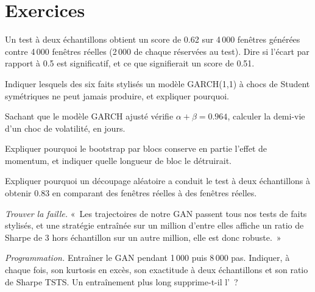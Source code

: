 \section{Exercices}

\begin{exercise}[$\star$]\label{exo:ml:generative-models-and-synthetic-data:1}
Un test à deux échantillons obtient un score de 0.62 sur 4\,000 fenêtres générées contre 4\,000 fenêtres réelles (2\,000 de chaque réservées au test). Dire si l'écart
par rapport à 0.5 est significatif, et ce que signifierait un score de 0.51.
\end{exercise}

\begin{exercise}[$\star$]\label{exo:ml:generative-models-and-synthetic-data:2}
Indiquer lesquels des six faits stylisés un modèle GARCH(1,1) à chocs de Student symétriques ne peut jamais produire, et expliquer pourquoi.
\end{exercise}

\begin{exercise}[$\star$]\label{exo:ml:generative-models-and-synthetic-data:3}
Sachant que le modèle GARCH ajusté vérifie $\alpha + \beta = 0.964$, calculer la demi-vie d'un choc de volatilité, en jours.
\end{exercise}

\begin{exercise}[$\star\star$]\label{exo:ml:generative-models-and-synthetic-data:4}
Expliquer pourquoi le bootstrap par blocs conserve en partie l'effet de momentum, et indiquer quelle longueur de bloc le détruirait.
\end{exercise}

\begin{exercise}[$\star\star$]\label{exo:ml:generative-models-and-synthetic-data:5}
Expliquer pourquoi un découpage aléatoire a conduit le test à deux échantillons à obtenir 0.83 en comparant des fenêtres réelles à des fenêtres réelles.
\end{exercise}

\begin{exercise}[$\star\star$]\label{exo:ml:generative-models-and-synthetic-data:6}
\emph{Trouver la faille.} «~Les trajectoires de notre GAN passent tous nos tests de faits stylisés, et une stratégie entraînée sur un million d'entre elles affiche un
ratio de Sharpe de 3 hors échantillon sur un autre million, elle est donc robuste.~»
\end{exercise}

\begin{exercise}[$\star\star\star$]\label{exo:ml:generative-models-and-synthetic-data:7}
\emph{Programmation.} Entraîner le GAN pendant 1\,000 puis 8\,000 pas. Indiquer, à chaque fois, son kurtosis en excès, son exactitude à deux échantillons et son
ratio de Sharpe TSTS. Un entraînement plus long supprime-t-il l'~?
\end{exercise}

